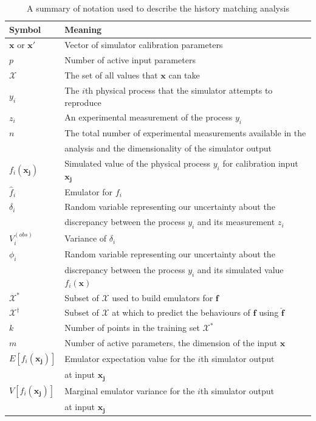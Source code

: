 \documentclass[
  12pt,
  a4paper,
  twoside]{book}
\begin{document}
\begin{table}\centering
\caption{A summary of notation used to describe the history matching analysis}
\label{tab:notation}
\begin{tabular}{|l|l|}
\hline
\textbf{Symbol}&\textbf{Meaning}\\
\hline
$\mathbf{x}$ or $\mathbf{x}'$& Vector of simulator calibration parameters\\
\hline
$p$& Number of active input parameters \\
\hline
$\mathcal{X}$&The set of all values that $\mathbf{x}$ can take \\
\hline
$y_i$& The $i$th physical process that the simulator attempts to reproduce\\
\hline
$z_i$& An experimental measurement of the process $y_i$\\
\hline
$n$& The total number of experimental measurements available in the\\
&analysis and the dimensionality of the simulator output\\
\hline
$f_i(\mathbf{x_j})$& Simulated value of the physical process $y_i$ for calibration input $\mathbf{x_j}$\\
\hline
$\hat{f}_i$& Emulator for $f_i$\\
\hline
$\delta_i$& Random variable representing our uncertainty about the\\ 
&discrepancy between the process $y_i$ and its measurement $z_i$\\
\hline
$V_i^{(obs)}$& Variance of $\delta_i$\\
\hline
$\phi_i$&Random variable representing our uncertainty about the\\
&discrepancy between the process $y_i$ and its simulated value $f_i(\mathbf{x})$\\
\hline
$\mathcal{X^*}$& Subset of $\mathcal{X}$ used to build emulators for $\mathbf{f}$\\
\hline
$\mathcal{X^\dagger}$& Subset of $\mathcal{X}$ at which to predict the behaviours of $\mathbf{f}$ using $\mathbf{\hat{f}}$\\
\hline
$k$& Number of points in the training set $\mathcal{X^*}$\\
\hline
$m$& Number of active parameters, the dimension of the input $\mathbf{x}$\\
\hline
$E[f_i(\mathbf{x_j})]$& Emulator expectation value for the $i$th simulator output\\ 
& at input $\mathbf{x_j}$\\
\hline
$V[f_i(\mathbf{x_j})]$& Marginal emulator variance for the $i$th simulator output\\ 
& at input $\mathbf{x_j}$\\
\hline
\end{tabular}
\end{table}
\end{document}
